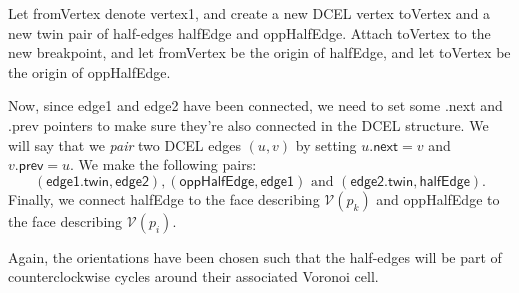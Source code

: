 Let \textsf{fromVertex} denote \textsf{vertex1}, and create a new DCEL vertex \textsf{toVertex} and a new twin pair of half-edges \textsf{halfEdge} and \textsf{oppHalfEdge}. Attach \textsf{toVertex} to the new breakpoint, and let \textsf{fromVertex} be the origin of \textsf{halfEdge}, and let \textsf{toVertex} be the origin of \textsf{oppHalfEdge}.

Now, since \textsf{edge1} and \textsf{edge2} have been connected, we need to set some \textsf{.next} and \textsf{.prev} pointers to make sure they're also connected in the DCEL structure. We will say that we \textit{pair} two DCEL edges $(u, v)$ by setting $u\textsf{.next} = v$ and $v\textsf{.prev} = u$. We make the following pairs:
\[
    (\textsf{edge1.twin}, \textsf{edge2}), (\textsf{oppHalfEdge}, \textsf{edge1}) \text{ and } (\textsf{edge2.twin}, \textsf{halfEdge}).
\]
Finally, we connect \textsf{halfEdge} to the face describing $\mathcal{V}(p_k)$ and \textsf{oppHalfEdge} to the face describing $\mathcal{V}(p_i)$.

Again, the orientations have been chosen such that the half-edges will be part of counterclockwise cycles around their associated Voronoi cell.